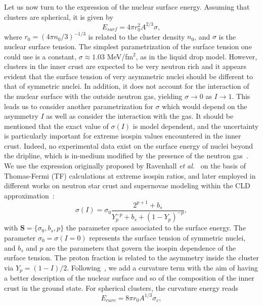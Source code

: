 Let us now turn to the expression of the nuclear surface energy. Assuming that
clusters are spherical, it is given by
%
\begin{equation}
  E_{surf} = 4\pi r_0^2A^{2/3}\sigma,\label{eq:esurf}
\end{equation}
%
where $r_0 = (4\pi n_0/3)^{-1/3}$ is related to the cluster density $n_0$, and
$\sigma$ is the nuclear surface tension. The simplest parametrization of the
surface tension one could use is a constant, $\sigma \approx 1.03$ MeV/fm$^2$, 
as in the liquid drop model. %
However, clusters in the inner crust are expected to be very neutron rich and
it appears evident that the surface tension of very asymmetric nuclei should be
different to that of symmetric nuclei. In addition, it does not account for
the interaction of the nuclear surface with the outside neutron gas, yielding 
$\sigma \rightarrow 0$ as $I\rightarrow 1$. 
This leads us to consider another parametrization for $\sigma$ which would 
depend on the asymmetry $I$ as well as consider the interaction with the gas.
It should be mentioned that the exact value of $\sigma(I)$ is model dependent, 
and the uncertainty is particularly important for extreme isospin values 
encountered in the inner crust. Indeed, no experimental data exist on the 
surface energy of nuclei beyond the dripline, which is in-medium modified by 
the presence of the neutron gas~\cite{Douchin2000b}.
We use the expression originally proposed by Ravenhall \textit{et
al.}~\cite{Ravenhall1983} on the basis of Thomas-Fermi (TF) calculations at
extreme isospin ratios, and later employed in different works on neutron star
crust and supernovae modeling within the 
CLD approximation~\cite{Lattimer1991,Newton2012,Lorenz1993}:
%
\begin{equation}
  \sigma(I) = \sigma_0\frac{2^{p+1} + b_s}{Y_p^{-p} + b_s + (1 -
  Y_p)^{-p}},\label{eq:sigma}
\end{equation}
%
with $\bm{S} = \{\sigma_0, b_s, p\}$ the parameter space associated to the
surface energy. The parameter $\sigma_0 = \sigma(I=0)$ represents the surface 
tension of symmetric nuclei, and $b_s$ and $p$ are the parameters that govern 
the isospin dependence of the surface tension. The proton fraction is 
related to the asymmetry inside the cluster via $Y_p = (1-I)/2$. 
Following~\cite{Newton2012}, we add a curvature term with the aim of having a
better description of the nuclear surface and so of the composition of the
inner crust in the ground state. For spherical clusters, the curvature energy
reads
%
\begin{equation}
  E_{curv} = 8\pi r_0A^{1/3}\sigma_c,\label{eq:ecurv}
\end{equation}

